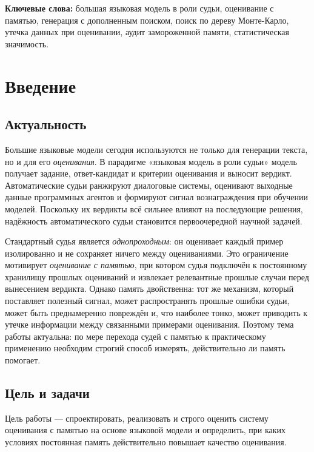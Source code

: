 \documentclass[14pt,a4paper]{extreport}
\begin{document}
\textbf{Ключевые слова:} большая языковая модель в роли судьи, оценивание с памятью, генерация с дополненным поиском, поиск по дереву Монте-Карло, утечка данных при оценивании, аудит замороженной памяти, статистическая значимость.

\chapter{Введение}

\section{Актуальность}

Большие языковые модели сегодня используются не только для генерации текста, но и для его \emph{оценивания}. В парадигме «языковая модель в роли судьи» модель получает задание, ответ-кандидат и критерии оценивания и выносит вердикт. Автоматические судьи ранжируют диалоговые системы, оценивают выходные данные программных агентов и формируют сигнал вознаграждения при обучении моделей. Поскольку их вердикты всё сильнее влияют на последующие решения, надёжность автоматического судьи становится первоочередной научной задачей.

Стандартный судья является \emph{однопроходным}: он оценивает каждый пример изолированно и не сохраняет ничего между оцениваниями. Это ограничение мотивирует \emph{оценивание с памятью}, при котором судья подключён к постоянному хранилищу прошлых оцениваний и извлекает релевантные прошлые случаи перед вынесением вердикта. Однако память двойственна: тот же механизм, который поставляет полезный сигнал, может распространять прошлые ошибки судьи, может быть преднамеренно повреждён и, что наиболее тонко, может приводить к утечке информации между связанными примерами оценивания. Поэтому тема работы актуальна: по мере перехода судей с памятью к практическому применению необходим строгий способ измерять, действительно ли память помогает.

\section{Цель и задачи}

Цель работы — спроектировать, реализовать и строго оценить систему оценивания с памятью на основе языковой модели и определить, при каких условиях постоянная память действительно повышает качество оценивания.
\end{document}
